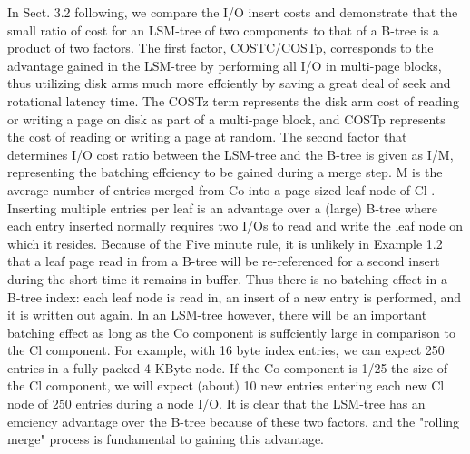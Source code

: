 \documentclass[a4paper,11pt,notitlepage,twoside,openright]{article}
\begin{document}
In Sect. 3.2 following, we compare the I/O insert costs and demonstrate
that the small ratio of cost for an LSM-tree of two components to that
of a B-tree is a product of two factors. The first factor, COSTC/COSTp,
corresponds to the advantage gained in the LSM-tree by performing all
I/O in multi-page blocks, thus utilizing disk arms much more effciently
by saving a great deal of seek and rotational latency time. The COSTz
term represents the disk arm cost of reading or writing a page on disk
as part of a multi-page block, and COSTp represents the cost of reading
or writing a page at random. The second factor that determines I/O cost
ratio between the LSM-tree and the B-tree is given as I/M, representing
the batching effciency to be gained during a merge step. M is the
average number of entries merged from Co into a page-sized leaf node of
Cl . Inserting multiple entries per leaf is an advantage over a (large)
B-tree where each entry inserted normally requires two I/Os to read and
write the leaf node on which it resides. Because of the Five minute
rule, it is unlikely in Example 1.2 that a leaf page read in from a
B-tree will be re-referenced for a second insert during the short time
it remains in buffer. Thus there is no batching effect in a B-tree
index: each leaf node is read in, an insert of a new entry is performed,
and it is written out again. In an LSM-tree however, there will be an
important batching effect as long as the Co component is suffciently
large in comparison to the Cl component. For example, with 16 byte index
entries, we can expect 250 entries in a fully packed 4 KByte node. If
the Co component is 1/25 the size of the Cl component, we will expect
(about) 10 new entries entering each new Cl node of 250 entries during a
node I/O. It is clear that the LSM-tree has an emciency advantage over
the B-tree because of these two factors, and the "rolling merge" process
is fundamental to gaining this advantage.
\end{document}
